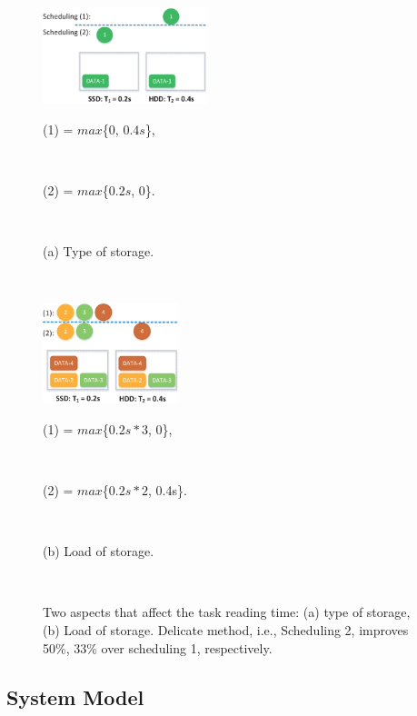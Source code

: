 \documentclass[conference]{IEEEtran}
\begin{document}
\begin{figure}[!t]
\centering
    \begin{minipage}{4.78cm}
        \includegraphics[width=4.78cm]{fig_example1_4.eps}
        \centerline{\footnotesize{(1) = $max$\{0, $0.4s$\},}}\\
        \centerline{\footnotesize{(2) = $max$\{$0.2s$, 0\}.}}\\
         \centerline{(a) Type of storage.}\\
    \end{minipage}
    \begin{minipage}{3.95cm}
        \includegraphics[width=3.95cm]{fig_example2_3.eps}
        \centerline{\footnotesize{(1) = $max$\{$0.2s*3$, 0\},}}\\
        \centerline{\footnotesize{(2) = $max$\{$0.2s*2$, 0.4s\}.}}\\
         \centerline{(b) Load of storage.}\\
    \end{minipage}
    \vspace{-0.4cm}
    \caption{Two aspects that affect the task reading time: (a) type of storage, (b) Load of storage. Delicate method, i.e., Scheduling 2, improves 50\%, 33\% over scheduling 1, respectively.}
    \label{Fig:example}
    \vspace{-0.2cm}
\end{figure}

\subsection{System Model}
\end{document}
